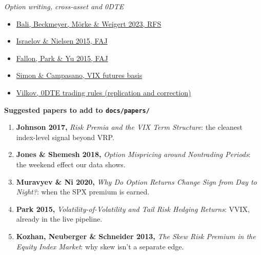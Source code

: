 \documentclass{article}
\begin{document}
\emph{Option writing, cross-asset and 0DTE}

\begin{itemize}

\item \href{https://econpapers.repec.org/RePEc:oup:rfinst:v:36:y:2023:i:9:p:3548-3602.}{Bali, Beckmeyer, Mörke \& Weigert 2023, RFS}

\item \href{https://ideas.repec.org/a/taf/ufajxx/v71y2015i6p44-57.html}{Israelov \& Nielsen 2015, FAJ}

\item \href{https://ideas.repec.org/a/taf/ufajxx/v71y2015i5p38-56.html}{Fallon, Park \& Yu 2015, FAJ}

\item \href{https://www.efmaefm.org/0EFMAMEETINGS/EFMA\%20ANNUAL\%20MEETINGS/2013-Reading/papers/VIX\%20paper_EFMA.pdf}{Simon \& Campasano, VIX futures basis}

\item \href{https://github.com/vilkovgr/0dte-strategies}{Vilkov, 0DTE trading rules (replication and correction)}

\end{itemize}

\textbf{Suggested papers to add to \texttt{docs/\allowbreak{}papers/\allowbreak{}}}

\begin{enumerate}

\item \textbf{Johnson 2017,} \emph{Risk Premia and the VIX Term Structure}: the cleanest index-level signal beyond VRP.

\item \textbf{Jones \& Shemesh 2018,} \emph{Option Mispricing around Nontrading Periods}: the weekend effect our data shows.

\item \textbf{Muravyev \& Ni 2020,} \emph{Why Do Option Returns Change Sign from Day to Night?}: when the SPX premium is earned.

\item \textbf{Park 2015,} \emph{Volatility-of-Volatility and Tail Risk Hedging Returns}: VVIX, already in the live pipeline.

\item \textbf{Kozhan, Neuberger \& Schneider 2013,} \emph{The Skew Risk Premium in the Equity Index Market}: why skew isn't a separate edge.

\end{enumerate}
\end{document}
